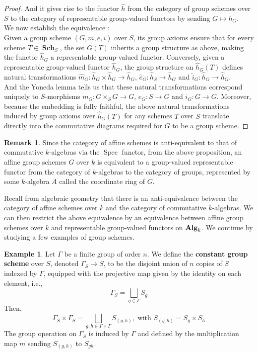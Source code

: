 \documentclass{article}
\theoremstyle{plain}
\theoremstyle{definition}
\newtheorem{remark}{Remark}
\newtheorem{example}[theorem]{Example}
\DeclareMathOperator{\Spec}{Spec}
\DeclareMathOperator{\Sch}{\textbf{Sch}}
\DeclareMathOperator{\Alg}{\bf{Alg}}
\begin{document}
\begin{proof}
And it gives rise to the functor $\widehat{h}$ from the category of group schemes over $S$ to the category of representable group-valued functors by sending $G\mapsto h_G$.\\
We now establish the equivalence : \\
Given a group scheme $(G,m,e,i)$ over $S$, its group axioms ensure that for every scheme $T\in \Sch_S$, the set $G(T)$ inherits a group structure as above, making the functor $\widehat{h}_G$ a representable group-valued functor.
Conversely, given a representable group-valued functor $\widehat{h}_G$, the group structure on $\widehat{h}_G(T)$ defines natural transformations  
$\widehat{m}_G :\widehat{h}_G\times \widehat{h}_G\rightarrow \widehat{h}_G$,
$\widehat{e}_G :\widehat{h}_S\rightarrow \widehat{h}_G$ and
$\widehat{i}_G :\widehat{h}_G\rightarrow \widehat{h}_G$.\\
And the Yoneda lemma tells us that these natural transformations correspond uniquely to $S$-morphisms $m_G:G\times_S G\rightarrow G$, $e_G:S\rightarrow G$ and $i_G:G\rightarrow G$. 
Moreover, because the embedding is fully faithful, the above natural transformations induced by group axioms over $\widehat{h}_G(T)$ for any schemes $T$ over $S$ translate directly into the commutative diagrams required for $G$ to be a group scheme.
\end{proof}


\begin{remark}
\label{affine_group_schemes_as_functors}
    Since the category of affine schemes is anti-equivalent to that of commutative $k$-algebras via the $\Spec$ functor, from the above proposition, 
    an affine group schemes $G$ over $k$ is equivalent to a group-valued representable functor from the category of $k$-algebras to the category of groups, represented by some $k$-algebra $A$ called the coordinate ring of $G$.
\end{remark}



\noindent Recall from algebraic geometry that there is an anti-equivalence between the category of affine schemes over $k$ and the category of commutative $k$-algebras. 
We can then restrict the above equivalence by an equivalence between affine group schemes over $k$ and representable group-valued functors on $\Alg_k$.
We continue by studying a few examples of group schemes.

\begin{example}
    Let $\Gamma$ be a finite group of order $n$. 
    We define the \textbf{constant group scheme} over $S$, denoted $\Gamma_S\rightarrow S$, to be the disjoint union of $n$ copies of $S$ indexed by $\Gamma$,
    equipped with the projective map given by the identity on each element, i.e.,
    $$\Gamma_S = \bigsqcup_{g\in \Gamma} S_g$$
    Then,
    $$\Gamma_S\times \Gamma_S = \bigsqcup_{g,h\in \Gamma\times\Gamma} S_{(g,h)}, \text{ with }S_{(g,h)} = S_g\times S_h$$
    The group operation on $\Gamma_S$ is induced by $\Gamma$ and defined by the multiplication map $m$ sending $S_{(g,h)}$ to $S_{gh}$.
\end{example}
\end{document}
